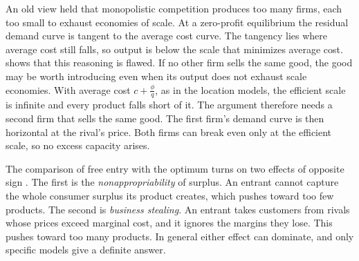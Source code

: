  An old view held that monopolistic competition produces too many firms, each
too small to exhaust economies of scale. At a zero-profit equilibrium the residual demand curve is tangent to the
average cost curve. The tangency lies where average cost still falls, so output is below the scale that minimizes
average cost.  shows that this reasoning is flawed. If no other firm sells the same
good, the good may be worth introducing even when its output does not exhaust scale economies. With average cost
$c + \frac{\phi}{q}$, as in the location models, the efficient scale is infinite and every product falls short of it.
The argument therefore needs a second firm that sells the same good. The first firm's demand curve is then horizontal
at the rival's price. Both firms can break even only at the efficient scale, so no excess capacity arises.

 The comparison of free entry with the optimum turns on two effects of opposite sign
\citep[Section 7.2]{Tirole1988}. The first is the \emph{nonappropriability} of surplus. An entrant cannot capture the
whole consumer surplus its product creates, which pushes toward too few products. The second is \emph{business
stealing}. An entrant takes customers from rivals whose prices exceed marginal cost, and it ignores the margins they
lose. This pushes toward too many products. In general either effect can dominate, and only specific models give a
definite answer.

